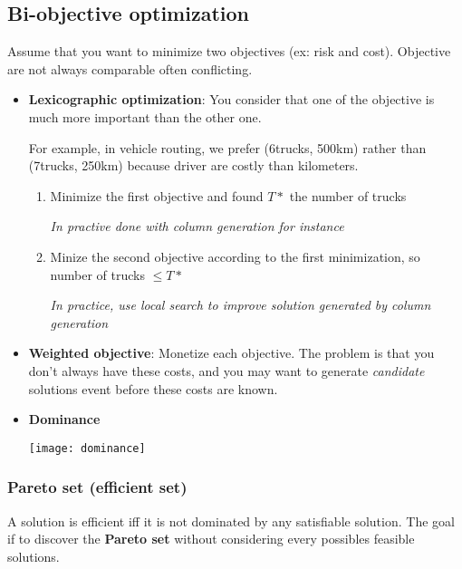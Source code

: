 
\subsection{Bi-objective optimization}

Assume that you want to minimize two objectives (ex: risk and cost).
Objective are not always comparable often conflicting.

\begin{itemize}
    \item \textbf{Lexicographic optimization}: You consider that one of
        the objective is much more important than the other one.

        For example, in vehicle routing, we prefer (6trucks, 500km) rather
        than (7trucks, 250km) because driver are costly than kilometers.

        \begin{enumerate}
            \item Minimize the first objective and found $T*$ the number
                of trucks

                \textit{In practive done with column generation for
                instance}
            \item Minize the second objective according to 
                the first minimization, so number of trucks $\leq T*$

                \textit{In practice, use local search to improve
                solution generated by column generation}
        \end{enumerate}

    \item \textbf{Weighted objective}: Monetize each objective. 
        The problem is that you don’t always have these costs,
        and you may want to generate \textit{candidate} solutions
        event before these costs are known.

    \item \textbf{Dominance}
        \begin{center}
            \texttt{[image: dominance]}
        \end{center}

\end{itemize}


\subsubsection{Pareto set (efficient set)}
A solution is efficient iff it is not dominated by any
satisfiable solution. The goal if to discover the \textbf{Pareto set}
without considering every possibles feasible solutions.

